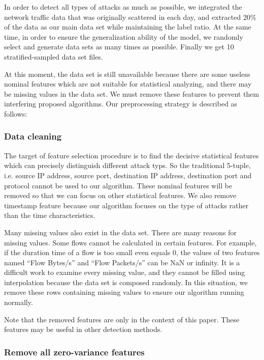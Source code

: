 \documentclass{ieeeaccess}
\theoremstyle{definition}
\begin{document}
In order to detect all types of attacks as much as possible, we integrated the network traffic data that was originally scattered in each day, and extracted 20\% of the data as our main data set while maintaining the label ratio. At the same time, in order to ensure the generalization ability of the model, we randomly select and generate data sets as many times as possible. Finally we get 10 stratified-sampled data set files.

At this moment, the data set is still unavailable because there are some useless nominal features which are not suitable for statistical analyzing, and there may be missing values in the data set. We must remove these features to prevent them interfering proposed algorithms. Our preprocessing strategy is described as follows:

\subsubsection{Data cleaning}
The target of feature selection procedure is to find the decisive statistical features which can precisely distinguish different attack typs.
So the traditional 5-tuple, i.e. source IP address, source port, destination IP address, destination port and protocol cannot be used to our algorithm.
These nominal features will be removed so that we can focus on other statistical features.
We also remove timestamp feature because our algorithm focuses on the type of attacks rather than the time characteristics.

Many missing values also exist in the data set. There are many reasons for missing values. Some flows cannot be calculated in certain features. For example, if the duration time of a flow is too small even equals 0, the values of two features named ``Flow Bytes/s'' and ``Flow Packets/s'' can be NaN or infinity. It is a difficult work to examine every missing value, and they cannot be filled using interpolation because the data set is composed randomly. In this situation, we remove these rows containing missing values to ensure our algorithm running normally.

Note that the removed features are only in the context of this paper. These features may be useful in other detection methods.

\subsubsection{Remove all zero-variance features}
\end{document}

